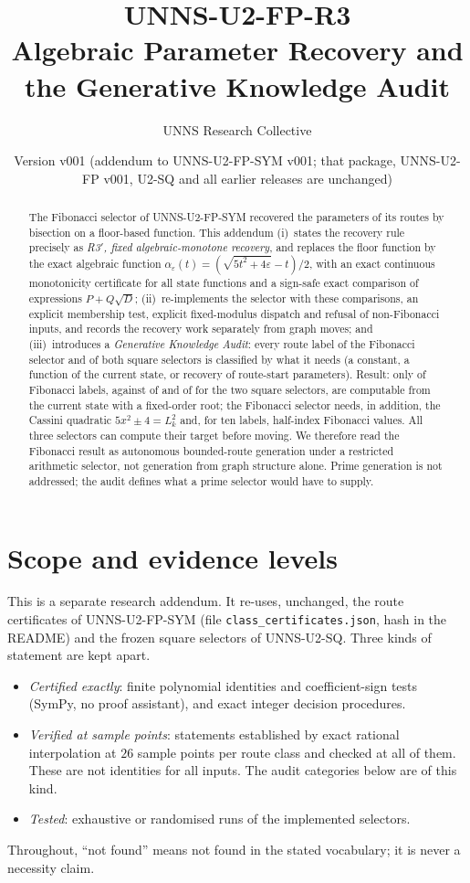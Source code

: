 \documentclass[11pt]{article}
\title{\textbf{UNNS-U2-FP-R3}\\[2pt]\large Algebraic Parameter Recovery and the Generative Knowledge Audit}
\author{UNNS Research Collective}
\date{Version v001 \quad (addendum to UNNS-U2-FP-SYM v001; that package, UNNS-U2-FP v001, U2-SQ and all earlier releases are unchanged)}
\theoremstyle{definition}
\theoremstyle{remark}
\begin{document}
\maketitle
\begin{abstract}
\noindent
The Fibonacci selector of UNNS-U2-FP-SYM recovered the parameters of its routes by bisection on a floor-based function. This addendum (i)~states the recovery rule precisely as \emph{R3$'$, fixed algebraic-monotone recovery}, and replaces the floor function by the exact algebraic function $\alpha_\varepsilon(t)=(\sqrt{5t^2+4\varepsilon}-t)/2$, with an exact continuous monotonicity certificate for all \NStates{} state functions and a sign-safe exact comparison of expressions $P+Q\sqrt D$; (ii)~re-implements the selector with these comparisons, an explicit membership test, explicit fixed-modulus dispatch and refusal of non-Fibonacci inputs, and records the recovery work separately from graph moves; and (iii)~introduces a \emph{Generative Knowledge Audit}: every route label of the Fibonacci selector and of both square selectors is classified by what it needs (a constant, a function of the current state, or recovery of route-start parameters). Result: only \FibNoRec{} of \NFib{} Fibonacci labels, against \SqDNoRec{} of \NSqD{} and \SqWNoRec{} of \NSqW{} for the two square selectors, are computable from the current state with a fixed-order root; the Fibonacci selector needs, in addition, the Cassini quadratic $5x^2\pm4=L_k^2$ and, for ten labels, half-index Fibonacci values. All three selectors can compute their target before moving. We therefore read the Fibonacci result as autonomous bounded-route generation under a restricted arithmetic selector, not generation from graph structure alone. Prime generation is not addressed; the audit defines what a prime selector would have to supply.
\end{abstract}

\section{Scope and evidence levels}
This is a separate research addendum. It re-uses, unchanged, the route certificates of UNNS-U2-FP-SYM (file \texttt{class\_certificates.json}, hash in the README) and the frozen square selectors of UNNS-U2-SQ. Three kinds of statement are kept apart.
\begin{itemize}\setlength\itemsep{1pt}
\item \emph{Certified exactly}: finite polynomial identities and coefficient-sign tests (SymPy, no proof assistant), and exact integer decision procedures.
\item \emph{Verified at sample points}: statements established by exact rational interpolation at $26$ sample points per route class and checked at all of them. These are not identities for all inputs. The audit categories below are of this kind.
\item \emph{Tested}: exhaustive or randomised runs of the implemented selectors.
\end{itemize}
Throughout, ``not found'' means not found in the stated vocabulary; it is never a necessity claim.
\end{document}

